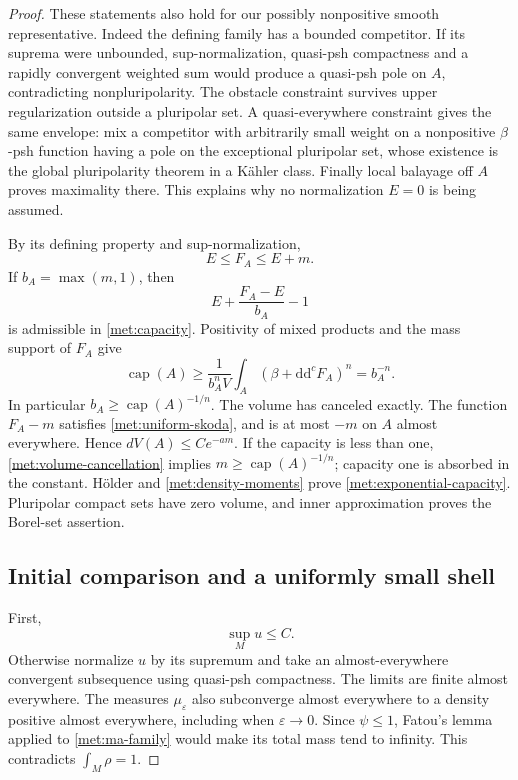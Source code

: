 \documentclass[11pt,letterpaper]{article}
\newcommand{\ddc}{\mathrm{d}\mathrm{d}^{c}}
\theoremstyle{definition}
\theoremstyle{remark}
\begin{document}
\begin{proof}
These statements also hold for our possibly nonpositive smooth
representative.  Indeed the defining family has a bounded competitor.
If its suprema were unbounded, sup-normalization, quasi-psh compactness
and a rapidly convergent weighted sum would produce a quasi-psh pole
on \(A\), contradicting nonpluripolarity.  The obstacle constraint
survives upper regularization outside a pluripolar set.  A
quasi-everywhere constraint gives the same envelope: mix a competitor
with arbitrarily small weight on a nonpositive \(\beta\)-psh function
having a pole on the exceptional pluripolar set, whose existence is
the global pluripolarity theorem in a K\"ahler class.  Finally local
balayage off \(A\) proves maximality there.  This explains why no
normalization \(E=0\) is being assumed.

By its defining property and sup-normalization,
\[
 E\leq F_A\leq E+m.
\]
If \(b_A=\max(m,1)\), then
\[
 E+\frac{F_A-E}{b_A}-1
\]
is admissible in \eqref{met:capacity}.  Positivity of mixed products
and the mass support of \(F_A\) give
\begin{equation}
 \label{met:volume-cancellation}
 \operatorname{cap}(A)
 \geq\frac{1}{b_A^nV}\int_A(\beta+\ddc F_A)^n
 =b_A^{-n}.
\end{equation}
In particular \(b_A\geq\operatorname{cap}(A)^{-1/n}\).  The volume
has canceled exactly.  The function \(F_A-m\) satisfies
\eqref{met:uniform-skoda}, and is at most \(-m\) on \(A\) almost
everywhere.  Hence \(dV(A)\leq C e^{-a m}\).  If the capacity is less
than one, \eqref{met:volume-cancellation} implies
\(m\geq\operatorname{cap}(A)^{-1/n}\); capacity one is absorbed in the
constant.  H\"older and \eqref{met:density-moments} prove
\eqref{met:exponential-capacity}.  Pluripolar compact sets have zero
volume, and inner approximation proves the Borel-set assertion.

\subsection*{Initial comparison and a uniformly small shell}

First,
\begin{equation}
 \label{met:upper-u}
 \sup_M u\leq C.
\end{equation}
Otherwise normalize \(u\) by its supremum and take an almost-everywhere
convergent subsequence using quasi-psh compactness.  The limits are
finite almost everywhere.  The measures \(\mu_\varepsilon\) also
subconverge almost everywhere to a density positive almost everywhere,
including when \(\varepsilon\to0\).  Since \(\psi\leq1\), Fatou's
lemma applied to \eqref{met:ma-family} would make its total mass tend
to infinity.  This contradicts \(\int_M\rho=1\).


\end{proof}
\end{document}
